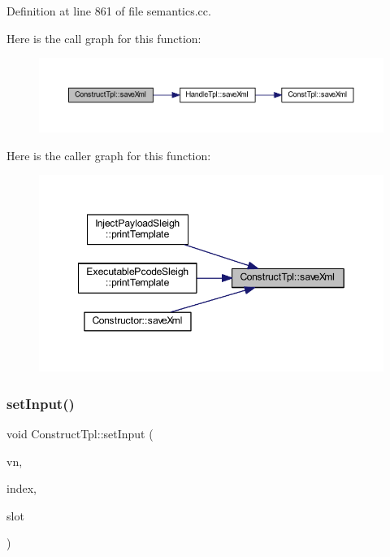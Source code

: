 Definition at line 861 of file semantics.\+cc.

Here is the call graph for this function\+:
\nopagebreak
\begin{figure}[H]
\begin{center}
\leavevmode
\includegraphics[width=350pt]{class_construct_tpl_af26ca1f89d087ed17c153b0fefdb8a14_cgraph}
\end{center}
\end{figure}
Here is the caller graph for this function\+:
\nopagebreak
\begin{figure}[H]
\begin{center}
\leavevmode
\includegraphics[width=349pt]{class_construct_tpl_af26ca1f89d087ed17c153b0fefdb8a14_icgraph}
\end{center}
\end{figure}
\mbox{\label{class_construct_tpl_a081103bb58d0e252b4b5b482c49113c6}} 
\subsubsection{\texorpdfstring{setInput()}{setInput()}}
{\footnotesize\ttfamily void Construct\+Tpl\+::set\+Input (\begin{DoxyParamCaption}\item[{\mbox{\hyperlink{class_varnode_tpl}{Varnode\+Tpl}} $\ast$}]{vn,  }\item[{int4}]{index,  }\item[{int4}]{slot }\end{DoxyParamCaption})}



